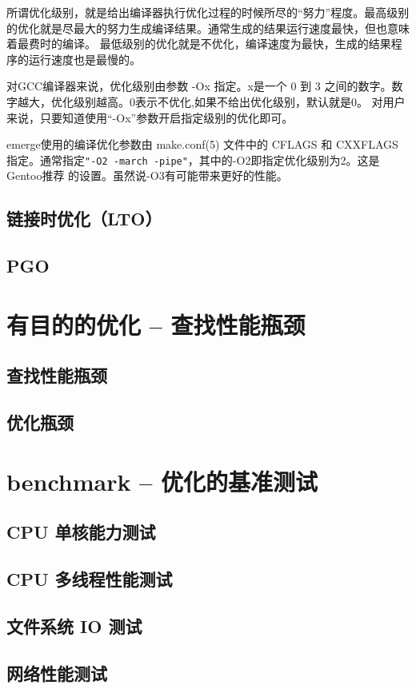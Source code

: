 \documentclass[amstex,twoside]{ctexbook}
\begin{document}
所谓优化级别，就是给出编译器执行优化过程的时候所尽的“努力”程度。最高级别的优化就是尽最大的努力生成编译结果。通常生成的结果运行速度最快，但也意味着最费时的编译。
最低级别的优化就是不优化，编译速度为最快，生成的结果程序的运行速度也是最慢的。

对GCC编译器来说，优化级别由参数 -Ox 指定。x是一个  0 到 3 之间的数字。数字越大，优化级别越高。0表示不优化,如果不给出优化级别，默认就是0。
对用户来说，只要知道使用“-Ox”参数开启指定级别的优化即可。

emerge{}使用的编译优化参数由 make.conf(5) 文件中的{ }CFLAGS{ }和{ }CXXFLAGS{ }指定。通常指定\texttt{"-O2 -march -pipe"}，其中的-O2即指定优化级别为2。这是Gentoo推荐
的设置。虽然说-O3有可能带来更好的性能。



\subsection{  链接时优化（LTO）	}
\subsection{  PGO	}
\section{  有目的的优化 – 查找性能瓶颈}
\subsection{ 查找性能瓶颈}
\subsection{  优化瓶颈}
\section{  benchmark – 优化的基准测试}
\subsection{  CPU 单核能力测试}
\subsection{  CPU 多线程性能测试}
\subsection{  文件系统 IO 测试}
\subsection{  网络性能测试}
\end{document}
